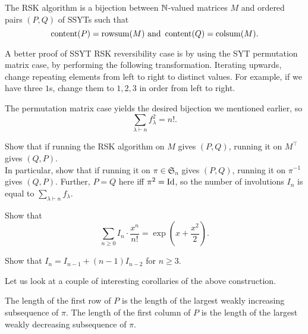 

	\begin{ftheo}
		The RSK algorithm is a bijection between $\mathbb{N}$-valued matrices $M$ and ordered pairs $(P,Q)$ of SSYTs such that
		\[ \operatorname{content}(P) = \operatorname{rowsum}(M) \text{ and } \operatorname{content}(Q) = \operatorname{colsum}(M). \] 
	\end{ftheo}

	A better proof of SSYT RSK reversibility case is by using the SYT permutation matrix case, by performing the following transformation. Iterating upwards, change repeating elements from left to right to distinct values. For example, if we have three $1$s, change them to $1,2,3$ in order from left to right.


	The permutation matrix case yields the desired bijection we mentioned earlier, so
	\[ \sum_{\lambda \vdash n} f_\lambda^2 = n!. \]

	\begin{exercise}
		Show that if running the RSK algorithm on $M$ gives $(P,Q)$, running it on $M^\top$ gives $(Q,P)$.\\
		In particular, show that if running it on $\pi \in \mathfrak{S}_n$ gives $(P,Q)$, running it on $\pi^{-1}$ gives $(Q,P)$. Further, $P = Q$ here iff $\pi^2 = \operatorname{Id}$, so the number of involutions $I_n$ is equal to $\sum_{\lambda \vdash n} f_\lambda$.
	\end{exercise}

	\begin{exercise}
		Show that
		\[ \sum_{n \ge 0} I_n \cdot \frac{x^n}{n!} = \exp\left( x + \frac{x^2}{2} \right). \]
	\end{exercise}
	\begin{exercise}
		Show that $I_n = I_{n-1} + (n-1) I_{n-2}$ for $n \ge 3$.
	\end{exercise}

	Let us look at a couple of interesting corollaries of the above construction.
	\begin{theorem}[Schenstead]
		The length of the first row of $P$ is the length of the largest weakly increasing subsequence of $\pi$. The length of the first column of $P$ is the length of the largest weakly decreasing subsequence of $\pi$.
	\end{theorem}

